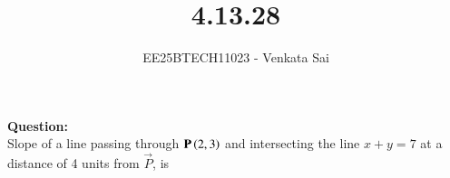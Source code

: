 \documentclass[journal]{IEEEtran}
\begin{document}


\title{4.13.28}
\author{EE25BTECH11023 - Venkata Sai}
\maketitle \vspace{-1cm}
\renewcommand{\thefigure}{\theenumi}
\renewcommand{\thetable}{\theenumi}
\setlength{\intextsep}{10pt} %

\renewcommand{\thetable}{\theenumi}

\textbf{Question:}  \\
Slope of a line passing through $\mathbf{P}\left(2,3\right)$ and intersecting the line $x+y=7$ at a distance of 4 units from $\vec{P}$, is
\end{document}
